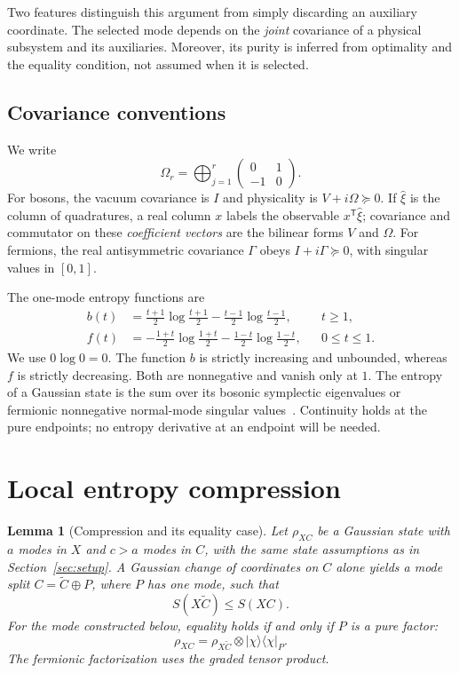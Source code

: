 \documentclass[11pt,a4paper]{article}
\numberwithin{equation}{section}
\newtheorem{lemma}[theorem]{Lemma}
\theoremstyle{remark}
\newcommand{\T}{\mathsf T}
\newcommand{\ket}[1]{\lvert#1\rangle}
\newcommand{\bra}[1]{\langle#1\rvert}
\begin{document}
Two features distinguish this argument from simply discarding an auxiliary coordinate. The selected mode depends on the \emph{joint} covariance of a physical subsystem and its auxiliaries. Moreover, its purity is inferred from optimality and the equality condition, not assumed when it is selected.

\subsection{Covariance conventions}
We write
\begin{equation}\label{eq:omega}
 \Omega_r=\bigoplus_{j=1}^r\begin{pmatrix}0&1\\-1&0\end{pmatrix}.
\end{equation}
For bosons, the vacuum covariance is $I$ and physicality is $V+i\Omega\succeq0$. If $\hat\xi$ is the column of quadratures, a real column $x$ labels the observable $x^{\T}\hat\xi$; covariance and commutator on these \emph{coefficient vectors} are the bilinear forms $V$ and $\Omega$. For fermions, the real antisymmetric covariance $\Gamma$ obeys $I+i\Gamma\succeq0$, with singular values in $[0,1]$.

The one-mode entropy functions are
\begin{align}
 b(t)&=\frac{t+1}{2}\log\frac{t+1}{2}
       -\frac{t-1}{2}\log\frac{t-1}{2}, &&t\ge1,\label{eq:boson-entropy}\\
 f(t)&=-\frac{1+t}{2}\log\frac{1+t}{2}
       -\frac{1-t}{2}\log\frac{1-t}{2}, &&0\le t\le1.\label{eq:fermion-entropy}
\end{align}
We use $0\log0=0$. The function $b$ is strictly increasing and unbounded, whereas $f$ is strictly decreasing. Both are nonnegative and vanish only at $1$. The entropy of a Gaussian state is the sum over its bosonic symplectic eigenvalues or fermionic nonnegative normal-mode singular values~\cite{Hackl2021}. Continuity holds at the pure endpoints; no entropy derivative at an endpoint will be needed.

\section{Local entropy compression}\label{sec:compression}
\begin{lemma}[Compression and its equality case]\label{lem:compression}
Let $\rho_{XC}$ be a Gaussian state with $a$ modes in $X$ and $c>a$ modes in $C$, with the same state assumptions as in Section~\ref{sec:setup}. A Gaussian change of coordinates on $C$ alone yields a mode split $C=\widetilde C\oplus P$, where $P$ has one mode, such that
\begin{equation}\label{eq:compression}
 S(X\widetilde C)\le S(XC).
\end{equation}
For the mode constructed below, equality holds if and only if $P$ is a pure factor:
\begin{equation}\label{eq:factor}
 \rho_{XC}=\rho_{X\widetilde C}\otimes\ket\chi\bra\chi_P.
\end{equation}
The fermionic factorization uses the graded tensor product.
\end{lemma}
\end{document}
